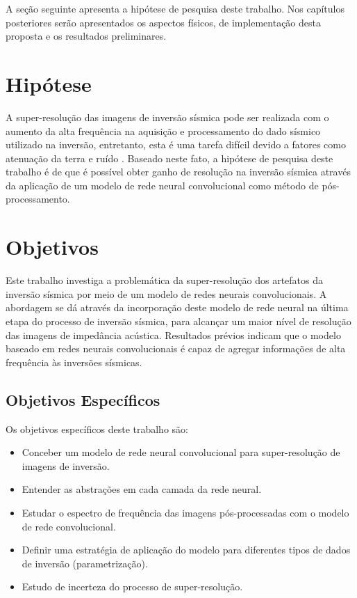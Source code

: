 A seção seguinte apresenta a hipótese de pesquisa deste trabalho. Nos capítulos posteriores
serão apresentados os aspectos físicos, de implementação desta proposta e os resultados preliminares.

\section{Hipótese}
A super-resolução das imagens de inversão sísmica pode ser realizada com o aumento da alta frequência na aquisição e
processamento do dado sísmico utilizado na inversão, entretanto, esta é uma tarefa difícil
devido a fatores como atenuação da terra e ruído \citep{Xiaoyu2012}.
Baseado neste fato, a hipótese de pesquisa deste trabalho é de que é possível obter ganho de resolução
na inversão sísmica através da aplicação de um modelo de rede neural convolucional como método de pós-processamento.

\section{Objetivos}

Este trabalho investiga a problemática da super-resolução dos artefatos da inversão sísmica
por meio de um modelo de redes neurais convolucionais.
A abordagem se dá através da incorporação deste modelo de rede neural na última
etapa do processo de inversão sísmica, para alcançar um maior nível de
resolução das imagens de impedância acústica.
Resultados prévios indicam que o modelo baseado em redes neurais convolucionais é capaz
de agregar informações de alta frequência às inversões sísmicas.

\subsection{Objetivos Específicos}
Os objetivos específicos deste trabalho são:
\begin{itemize}
 \item Conceber um modelo de rede neural convolucional para super-resolução de imagens de inversão.
 \item Entender as abstrações em cada camada da rede neural.
 \item Estudar o espectro de frequência das imagens pós-processadas com o modelo de rede convolucional.
 \item Definir uma estratégia de aplicação do modelo para diferentes tipos de dados de inversão (parametrização).
 \item Estudo de incerteza do processo de super-resolução.
\end{itemize}

